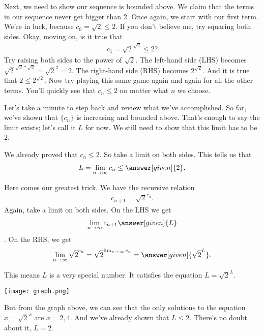 \documentclass{ximera}
\begin{document}
\begin{exercise}
\begin{exercise}
		\begin{exercise}
			Next, we need to show our sequence is bounded above. We claim that the terms in our sequence never get bigger than 2. Once again, we start with our first term. We're in luck, because $c_0=\sqrt{2} \leq 2$. If you don't believe me, try squaring both sides. Okay, moving on, is it true that
			\begin{align*}
			c_{1}=\sqrt{2}^{\sqrt{2}} \leq 2?
			\end{align*}
			Try raising both sides to the power of $\sqrt{2}$. The left-hand side (LHS) becomes $\sqrt{2}^{\sqrt{2}*\sqrt{2}} = \sqrt{2}^2=2$. The right-hand side (RHS) becomes $2^{\sqrt{2}}$. And it is true that $2\leq 2^{\sqrt{2}}$. Now try playing this same game again and again for all the other terms. You'll quickly see that $c_n \leq 2$ no matter what $n$ we choose.
			
			Let's take a minute to step back and review what we've accomplished. So far, we've shown that $\{c_n\}$ is increasing and bounded above. That's enough to say the limit exists; let's call it $L$ for now. We still need to show that this limit has to be $2$.
			
			We already proved that $c_{n} \leq 2$. So take a limit on both sides. This tells us that
			\begin{align*}
			L = \lim_{n \to \infty} c_n \leq \answer[given]{2}.
			\end{align*}
			
			Here comes our greatest trick. We have the recursive relation
			\begin{align*}
			c_{n+1} = \sqrt{2}^{c_n}.
			\end{align*}
			Again, take a limit on both sides. On the LHS we get
			\begin{align*}
				\lim_{n \to \infty} c_{n+1} \answer[given]{L}
			\end{align*}. 
			On the RHS, we get
			\begin{align*}
			\lim_{n \to \infty} \sqrt{2}^{c_n} = \sqrt{2}^{ \lim_{n \to \infty} c_n} = \answer[given]{\sqrt{2}^L}.
			\end{align*}
			
			\begin{exercise}
				This means $L$ is a very special number. It satisfies the equation $L=\sqrt{2}^L$.
				
				\begin{image}
					\texttt{[image: graph.png]}
				\end{image}
				
				But from the graph above, we can see that the only solutions to the equation $x=\sqrt{2}^x$ are $x=2,4$. And we've already shown that $L \leq 2$. There's no doubt about it, $L=2$.
			\end{exercise}
			
		\end{exercise}

	\end{exercise}
	
\end{exercise}
\end{document}
